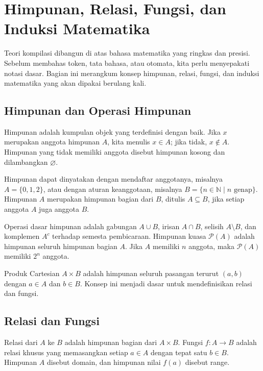 \section{Himpunan, Relasi, Fungsi, dan Induksi Matematika}
\label{sec:ch02-himpunan}

Teori kompilasi dibangun di atas bahasa matematika yang ringkas dan
presisi. Sebelum membahas token, tata bahasa, atau otomata, kita perlu
menyepakati notasi dasar. Bagian ini merangkum konsep himpunan, relasi,
fungsi, dan induksi matematika yang akan dipakai berulang kali.

\subsection{Himpunan dan Operasi Himpunan}

\begin{definisi}
Himpunan adalah kumpulan objek yang terdefinisi dengan baik. Jika \(x\)
merupakan anggota himpunan \(A\), kita menulis \(x \in A\); jika tidak,
\(x \notin A\). Himpunan yang tidak memiliki anggota disebut himpunan
kosong dan dilambangkan \(\varnothing\).
\end{definisi}

Himpunan dapat dinyatakan dengan mendaftar anggotanya, misalnya
\(A = \{0,1,2\}\), atau dengan aturan keanggotaan, misalnya
\(B = \{n \in \mathbb{N} \mid n \text{ genap}\}\). Himpunan \(A\)
merupakan himpunan bagian dari \(B\), ditulis \(A \subseteq B\), jika
setiap anggota \(A\) juga anggota \(B\).

Operasi dasar himpunan adalah gabungan \(A \cup B\), irisan
\(A \cap B\), selisih \(A \setminus B\), dan komplemen \(A^c\) terhadap
semesta pembicaraan. Himpunan kuasa \(\mathcal{P}(A)\) adalah himpunan
seluruh himpunan bagian \(A\). Jika \(A\) memiliki \(n\) anggota, maka
\(\mathcal{P}(A)\) memiliki \(2^n\) anggota.

Produk Cartesian \(A \times B\) adalah himpunan seluruh pasangan
terurut \((a,b)\) dengan \(a \in A\) dan \(b \in B\). Konsep ini menjadi
dasar untuk mendefinisikan relasi dan fungsi.

\subsection{Relasi dan Fungsi}

\begin{definisi}
Relasi dari \(A\) ke \(B\) adalah himpunan bagian dari \(A \times B\).
Fungsi \(f : A \to B\) adalah relasi khusus yang memasangkan setiap
\(a \in A\) dengan tepat satu \(b \in B\). Himpunan \(A\) disebut
domain, dan himpunan nilai \(f(a)\) disebut range.
\end{definisi}


